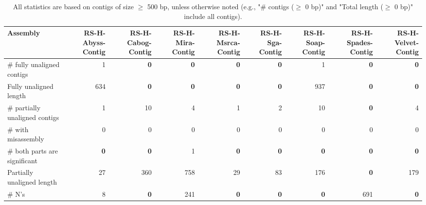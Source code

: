 \documentclass[12pt,a4paper]{article}
\begin{document}
\begin{table}[ht]
\begin{center}
\caption{All statistics are based on contigs of size $\geq$ 500 bp, unless otherwise noted (e.g., "\# contigs ($\geq$ 0 bp)" and "Total length ($\geq$ 0 bp)" include all contigs).}
\begin{tabular}{|l*{8}{|r}|}
\hline
Assembly & RS-H-Abyss-Contig & RS-H-Cabog-Contig & RS-H-Mira-Contig & RS-H-Msrca-Contig & RS-H-Sga-Contig & RS-H-Soap-Contig & RS-H-Spades-Contig & RS-H-Velvet-Contig \\ \hline
\# fully unaligned contigs & 1 & {\bf 0} & {\bf 0} & {\bf 0} & {\bf 0} & 1 & {\bf 0} & {\bf 0} \\ \hline
Fully unaligned length & 634 & {\bf 0} & {\bf 0} & {\bf 0} & {\bf 0} & 937 & {\bf 0} & {\bf 0} \\ \hline
\# partially unaligned contigs & 1 & 10 & 4 & 1 & 2 & 10 & {\bf 0} & 4 \\ \hline
\hspace{5mm}\# with misassembly & 0 & 0 & 0 & 0 & 0 & 0 & 0 & 0 \\ \hline
\hspace{5mm}\# both parts are significant & {\bf 0} & {\bf 0} & 1 & {\bf 0} & {\bf 0} & {\bf 0} & {\bf 0} & {\bf 0} \\ \hline
Partially unaligned length & 27 & 360 & 758 & 29 & 83 & 176 & {\bf 0} & 179 \\ \hline
\# N's & 8 & {\bf 0} & 241 & {\bf 0} & {\bf 0} & {\bf 0} & 691 & {\bf 0} \\ \hline
\end{tabular}
\end{center}
\end{table}
\end{document}

